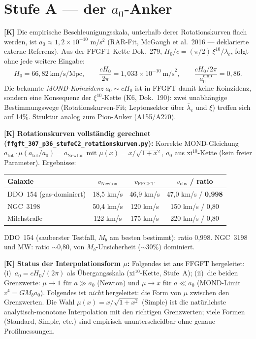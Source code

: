 \documentclass[11pt]{report}
\begin{document}
\section{Stufe A — der $a_0$-Anker}

\textbf{[K]} Die empirische Beschleunigungsskala, unterhalb derer
Rotationskurven flach werden, ist $a_0 \approx 1{,}2\times10^{-10}$
m/s$^2$ (RAR-Fit, McGaugh et al.\ 2016 — deklarierte externe
Referenz). Aus der FFGFT-Kette Dok.~279,
$H_0/c = (\pi/2)\,\xi^{10}/\bar\lambda_e$, folgt ohne jede weitere
Eingabe:
\[
  H_0 = 66{,}82~\text{km/s/Mpc}, \qquad
  \frac{cH_0}{2\pi} = 1{,}033\times10^{-10}~\text{m/s}^2,
  \qquad \frac{cH_0/2\pi}{a_0^{\text{emp}}} = 0{,}86.
\]
Die bekannte \emph{MOND-Koinzidenz} $a_0 \sim cH_0$ ist in FFGFT
damit keine Koinzidenz, sondern eine Konsequenz der $\xi^{10}$-Kette
(K6, Dok.~190):
zwei unabhängige Bestimmungswege (Rotationskurven-Fit; Leptonsektor
über $\bar\lambda_e$ und $\xi$) treffen sich auf 14\%. Struktur
analog zum Pion-Anker (A155/A270).

\medskip
\textbf{[K] Rotationskurven vollständig gerechnet
(\texttt{ffgft\_307\_p36\_stufeC2\_rotationskurven.py}):} Korrekte MOND-Gleichung
$a_\text{tot}\cdot\mu(a_\text{tot}/a_0) = a_\text{Newton}$ mit
$\mu(x) = x/\sqrt{1+x^2}$, $a_0$ aus xi$^{10}$-Kette (kein freier
Parameter). Ergebnisse:

\begin{center}
\begin{tabular}{lccc}
\toprule
Galaxie & $v_\text{Newton}$ & $v_\text{FFGFT}$ & $v_\text{obs}$ / ratio \\
\midrule
DDO~154 (gas-dominiert)   & 18{,}5 km/s & 46{,}9 km/s & 47{,}0 km/s / \textbf{0{,}998} \\
NGC~3198                  & 50{,}4 km/s & 120 km/s    & 150 km/s / 0{,}80 \\
Milchstraße               & 122 km/s    & 175 km/s    & 220 km/s / 0{,}80 \\
\bottomrule
\end{tabular}
\end{center}

DDO~154 (sauberster Testfall, $M_b$ am besten bestimmt): ratio 0{,}998.
NGC~3198 und MW: ratio $\sim$0{,}80, von $M_b$-Unsicherheit ($\sim$30\%)
dominiert.

\medskip
\textbf{[K] Status der Interpolationsform $\mu$:}
Folgendes ist aus FFGFT hergeleitet:
(i)~$a_0 = cH_0/(2\pi)$ als Übergangs\-skala (xi$^{10}$-Kette, Stufe~A);
(ii)~die beiden Grenzwerte: $\mu \to 1$ für $a \gg a_0$ (Newton) und
$\mu \to x$ für $a \ll a_0$ (MOND-Limit $v^4 = GM_b a_0$).
Folgendes ist \emph{nicht} hergeleitet: die Form von $\mu$ zwischen
den Grenzwerten. Die Wahl $\mu(x) = x/\sqrt{1+x^2}$ (Simple) ist die
natürlichste analytisch-monotone Interpolation mit den richtigen
Grenzwerten; viele Formen (Standard, Simple, etc.) sind empirisch
ununterscheidbar ohne genaue Profilmessungen.
\end{document}
